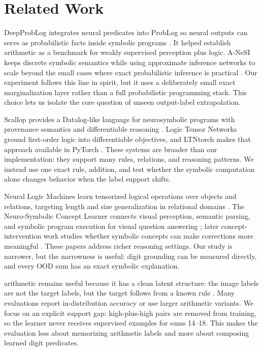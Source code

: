 \section{Related Work}
\label{sec:related}

 DeepProbLog integrates neural predicates into ProbLog so neural outputs can serve as probabilistic facts inside symbolic programs \cite{manhaeve2018deepproblog}. It helped establish \mnist arithmetic as a benchmark for weakly supervised perception plus logic. A-NeSI keeps discrete symbolic semantics while using approximate inference networks to scale beyond the small cases where exact probabilistic inference is practical \cite{vankrieken2022anesi}. Our experiment follows this line in spirit, but it uses a deliberately small exact marginalization layer rather than a full probabilistic programming stack. This choice lets us isolate the core question of unseen output-label extrapolation.

 Scallop provides a Datalog-like language for neurosymbolic programs with provenance semantics and differentiable reasoning \cite{li2023scallop}. Logic Tensor Networks ground first-order logic into differentiable objectives, and LTNtorch makes that approach available in PyTorch \cite{badreddine2022logic,carraro2024ltntorch}. These systems are broader than our implementation: they support many rules, relations, and reasoning patterns. We instead use one exact rule, addition, and test whether the symbolic computation alone changes behavior when the label support shifts.

 Neural Logic Machines learn tensorized logical operations over objects and relations, targeting length and size generalization in relational domains \cite{dong2019neural}. The Neuro-Symbolic Concept Learner connects visual perception, semantic parsing, and symbolic program execution for visual question answering \cite{mao2019neuro}; later concept-intervention work studies whether symbolic concepts can make corrections more meaningful \cite{stammer2021right}. These papers address richer reasoning settings. Our study is narrower, but the narrowness is useful: digit grounding can be measured directly, and every OOD sum has an exact symbolic explanation.

 \mnist arithmetic remains useful because it has a clean latent structure: the image labels are not the target labels, but the target follows from a known rule \cite{lecun1998gradient,manhaeve2018deepproblog}. Many \addmnist evaluations report in-distribution accuracy or use larger arithmetic variants. We focus on an explicit support gap: high-plus-high pairs are removed from training, so the learner never receives supervised examples for sums 14--18. This makes the evaluation less about memorizing arithmetic labels and more about composing learned digit predicates.
